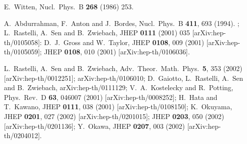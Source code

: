 \documentclass[a4paper,aps,preprint,nofootinbib,eqsecnum]{revtex4}
\begin{document}
\begin{thebibliography}{99}
 {\small E.~Witten,
Nucl.\ Phys.\ B \textbf{268} (1986) 253. %
}

 {\small A.~Abdurrahman, F.~Anton and J.~Bordes,
Nucl.\ Phys.\ B \textbf{411}, 693 (1994). %
;\newline
L.~Rastelli, A.~Sen and B.~Zwiebach, %
JHEP \textbf{0111} (2001) 035 [arXiv:hep-th/0105058]:\newline
D.~J.~Gross and W.~Taylor, %
JHEP \textbf{0108}, 009 (2001) [arXiv:hep-th/0105059];
%
%
JHEP \textbf{0108}, 010 (2001) [arXiv:hep-th/0106036].\newline
%
%
}

 {\small %
}

{\small %
L.~Rastelli, A.~Sen and B.~Zwiebach,
Adv.\ Theor.\ Math.\ Phys.\ \textbf{5}, 353 (2002) [arXiv:hep-th/0012251];
arXiv:hep-th/0106010; \newline
%
%
D.~Gaiotto, L.~Rastelli, A.~Sen and B.~Zwiebach,
arXiv:hep-th/0111129;\newline
%
V.~A.~Kostelecky and R.~Potting,
Phys.\ Rev.\ D \textbf{63}, 046007 (2001) [arXiv:hep-th/0008252];\newline
%
H.~Hata and T.~Kawano,
JHEP \textbf{0111}, 038 (2001) [arXiv:hep-th/0108150];\newline
K.~Okuyama, %
JHEP \textbf{0201}, 027 (2002) [arXiv:hep-th/0201015]; %
JHEP \textbf{0203}, 050 (2002) [arXiv:hep-th/0201136];\newline
%
Y.~Okawa,
JHEP \textbf{0207}, 003 (2002) [arXiv:hep-th/0204012].
}


\end{thebibliography}
\end{document}
